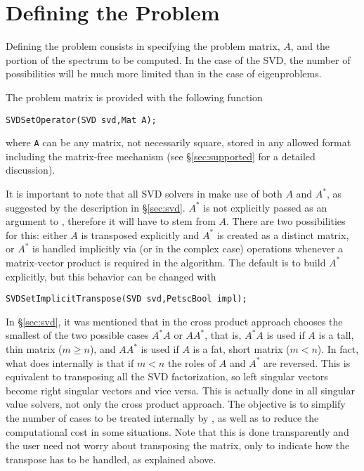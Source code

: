 \section{Defining the Problem}

Defining the problem consists in specifying the problem matrix, $A$, and the portion of the spectrum to be computed. In the case of the SVD, the number of possibilities will be much more limited than in the case of eigenproblems.

The problem matrix is provided with the following function
	\begin{Verbatim}[fontsize=\small]
	SVDSetOperator(SVD svd,Mat A);
	\end{Verbatim}
where \texttt{A} can be any matrix, not necessarily square, stored in any allowed \petsc format including the matrix-free mechanism (see \S\ref{sec:supported} for a detailed discussion).

It is important to note that all SVD solvers in \slepc make use of both $A$ and $A^*$, as suggested by the description in \S\ref{sec:svd}. $A^*$ is not explicitly passed as an argument to , therefore it will have to stem from $A$. There are two possibilities for this: either $A$ is transposed explicitly and $A^*$ is created as a distinct matrix, or $A^*$ is handled implicitly via  (or  in the complex case) operations whenever a matrix-vector product is required in the algorithm. The default is to build $A^*$ explicitly, but this behavior can be changed with 
	\begin{Verbatim}[fontsize=\small]
	SVDSetImplicitTranspose(SVD svd,PetscBool impl);
	\end{Verbatim}

In \S\ref{sec:svd}, it was mentioned that in \slepc the cross product approach chooses the smallest of the two possible cases $A^*A$ or $AA^*$, that is, $A^*A$ is used if $A$ is a tall, thin matrix ($m\geq n$), and $AA^*$ is used if $A$ is a fat, short matrix ($m<n$). In fact, what \slepc does internally is that if $m<n$ the roles of $A$ and $A^*$ are reversed. This is equivalent to transposing all the SVD factorization, so left singular vectors become right singular vectors and vice versa. This is actually done in all singular value solvers, not only the cross product approach. The objective is to simplify the number of cases to be treated internally by \slepc, as well as to reduce the computational cost in some situations. Note that this is done transparently and the user need not worry about transposing the matrix, only to indicate how the transpose has to be handled, as explained above.

